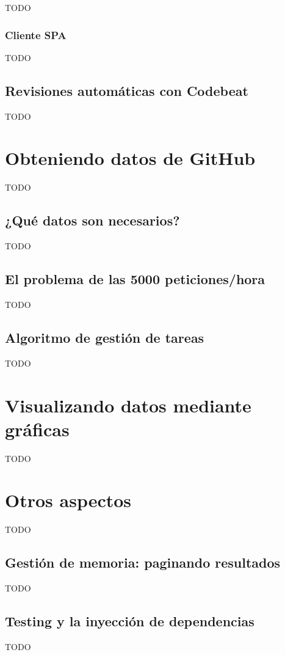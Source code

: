 TODO

\subsubsection{Cliente SPA}

TODO

\subsection{Revisiones automáticas con Codebeat}

TODO

\section{Obteniendo datos de GitHub}

TODO

\subsection{¿Qué datos son necesarios?}

TODO

\subsection{El problema de las 5000 peticiones/hora}

TODO

\subsection{Algoritmo de gestión de tareas}

TODO

\section{Visualizando datos mediante gráficas}

TODO

\section{Otros aspectos}

TODO

\subsection{Gestión de memoria: paginando resultados}

TODO

\subsection{Testing y la inyección de dependencias}

TODO